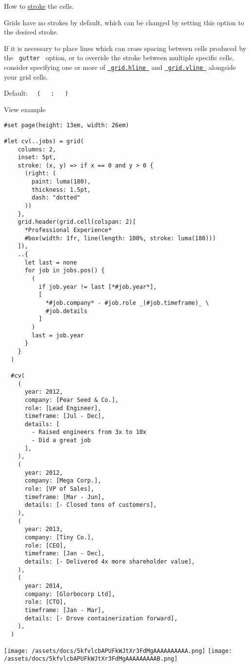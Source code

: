 How to \href{/docs/reference/visualize/stroke/}{stroke} the cells.

Grids have no strokes by default, which can be changed by setting this
option to the desired stroke.

If it is necessary to place lines which can cross spacing between cells
produced by the \texttt{\ gutter\ } option, or to override the stroke
between multiple specific cells, consider specifying one or more of
\href{/docs/reference/layout/grid/\#definitions-hline}{\texttt{\ grid.hline\ }}
and
\href{/docs/reference/layout/grid/\#definitions-vline}{\texttt{\ grid.vline\ }}
alongside your grid cells.

Default:
\texttt{\ }{\texttt{\ (\ }}\texttt{\ }{\texttt{\ :\ }}\texttt{\ }{\texttt{\ )\ }}\texttt{\ }


View example

\begin{verbatim}
#set page(height: 13em, width: 26em)

#let cv(..jobs) = grid(
    columns: 2,
    inset: 5pt,
    stroke: (x, y) => if x == 0 and y > 0 {
      (right: (
        paint: luma(180),
        thickness: 1.5pt,
        dash: "dotted"
      ))
    },
    grid.header(grid.cell(colspan: 2)[
      *Professional Experience*
      #box(width: 1fr, line(length: 100%, stroke: luma(180)))
    ]),
    ..{
      let last = none
      for job in jobs.pos() {
        (
          if job.year != last [*#job.year*],
          [
            *#job.company* - #job.role _(#job.timeframe)_ \
            #job.details
          ]
        )
        last = job.year
      }
    }
  )

  #cv(
    (
      year: 2012,
      company: [Pear Seed & Co.],
      role: [Lead Engineer],
      timeframe: [Jul - Dec],
      details: [
        - Raised engineers from 3x to 10x
        - Did a great job
      ],
    ),
    (
      year: 2012,
      company: [Mega Corp.],
      role: [VP of Sales],
      timeframe: [Mar - Jun],
      details: [- Closed tons of customers],
    ),
    (
      year: 2013,
      company: [Tiny Co.],
      role: [CEO],
      timeframe: [Jan - Dec],
      details: [- Delivered 4x more shareholder value],
    ),
    (
      year: 2014,
      company: [Glorbocorp Ltd],
      role: [CTO],
      timeframe: [Jan - Mar],
      details: [- Drove containerization forward],
    ),
  )
\end{verbatim}

\texttt{[image: /assets/docs/5kfvlcbAPUFkWJtXr3FdMgAAAAAAAAAA.png]}
\texttt{[image: /assets/docs/5kfvlcbAPUFkWJtXr3FdMgAAAAAAAAAB.png]}

